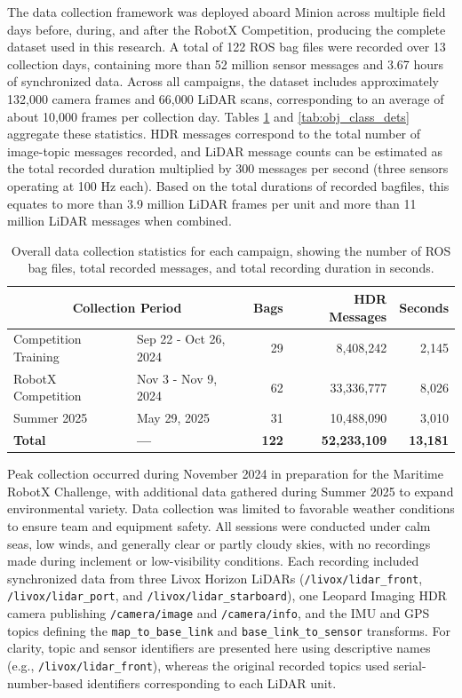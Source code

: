\documentclass[../main.tex]{subfiles}
\begin{document}
The data collection framework was deployed aboard Minion across multiple field days before, during, and after the RobotX Competition, producing the complete dataset used in this research.
A total of 122 ROS bag files were recorded over 13 collection days,  containing more than 52 million sensor messages and 3.67 hours of synchronized data.
Across all campaigns, the dataset includes approximately 132,000 camera frames and 66,000 LiDAR scans, corresponding to an average of about 10,000 frames per collection day.
Tables \ref{tab:rosbag_stats} and \ref{tab:obj_class_dets} aggregate these statistics.  
HDR messages correspond to the total number of image-topic messages recorded, and LiDAR message counts can be estimated as the total recorded duration multiplied by 300 messages per second (three sensors operating at 100 Hz each).
Based on the total durations of recorded bagfiles, this equates to more than 3.9 million LiDAR frames per unit and more than 11 million LiDAR messages when combined.

\begin{table}[htbp]
\centering
\begin{tabular}{llrrr}
\hline
\multicolumn{2}{c}{Collection Period} & Bags & HDR Messages & Seconds \\
\hline
\hline
Competition Training & Sep 22 - Oct 26, 2024 & 29 & 8,408,242 & 2,145 \\
RobotX Competition & Nov 3 - Nov 9, 2024 & 62 & 33,336,777 & 8,026 \\
Summer 2025  & May 29, 2025 & 31 & 10,488,090 & 3,010 \\
\hline
\textbf{Total} & \textbf{---} & \textbf{122} & \textbf{52,233,109} & \textbf{13,181} \\
\hline
\end{tabular}
\caption{Overall data collection statistics for each campaign, showing the number of ROS bag files, total recorded messages, and total recording duration in seconds.}
\label{tab:rosbag_stats}
\end{table}

Peak collection occurred during November 2024 in preparation for the Maritime RobotX Challenge, with additional data gathered during Summer 2025 to expand environmental variety.  
Data collection was limited to favorable weather conditions to ensure team and equipment safety. 
All sessions were conducted under calm seas, low winds, and generally clear or partly cloudy skies, with no recordings made during inclement or low-visibility conditions.
Each recording included synchronized data from three Livox Horizon LiDARs  (\texttt{/livox/lidar\_front}, \texttt{/livox/lidar\_port}, and  \texttt{/livox/lidar\_starboard}), one Leopard Imaging HDR camera publishing  \texttt{/camera/image} and \texttt{/camera/info}, and the IMU and GPS topics defining the  \texttt{map\_to\_base\_link} and \texttt{base\_link\_to\_sensor} transforms.
For clarity, topic and sensor identifiers are presented here using descriptive names (e.g., \texttt{/livox/lidar\_front}), whereas the original recorded topics used serial-number-based identifiers corresponding to each LiDAR unit.
\end{document}
